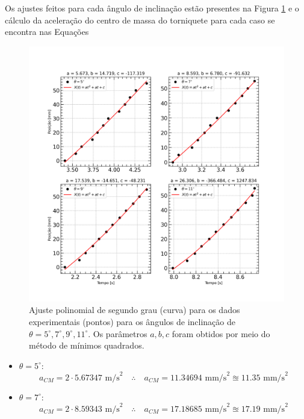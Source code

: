 \documentclass[12pt,a4paper]{article}
\begin{document}
\begin{enumerate}
    Os ajustes feitos para cada ângulo de inclinação estão presentes na Figura \ref{fig:Fit_theta} e o cálculo da aceleração do centro de massa do torniquete para cada caso se encontra nas Equações
    \begin{figure}[htp!]
        \centering
        \includegraphics[width=1.00\linewidth]{Figures/Fit_theta.png}
        \caption{Ajuste polinomial de segundo grau (curva) para os dados experimentais (pontos) para os ângulos de inclinação de $\theta=5^{\circ},7^{\circ},9^{\circ},11^{\circ}$. Os parâmetros $a,b,c$ foram obtidos por meio do método de mínimos quadrados.}
        \label{fig:Fit_theta}
    \end{figure}

    \begin{itemize}
    
        \item $\theta=5^{\circ}$:
        \begin{equation} \label{eq:a_CM - theta_5}
            a_{CM}=2\cdot 5.67347\text{ m/s}^{2}\quad\therefore\quad \boxed{a_{CM}=11.34694\text{ mm/s}^{2}\approxeq 11.35\text{ mm/s}^{2}}        
        \end{equation}

        \item $\theta=7^{\circ}$:
        \begin{equation} \label{eq:a_CM - theta_7}
            a_{CM}=2\cdot 8.59343\text{ m/s}^{2}\quad\therefore\quad \boxed{a_{CM}=17.18685\text{ mm/s}^{2}\approxeq 17.19\text{ mm/s}^{2}}
        \end{equation}


\end{itemize}
\end{enumerate}
\end{document}
